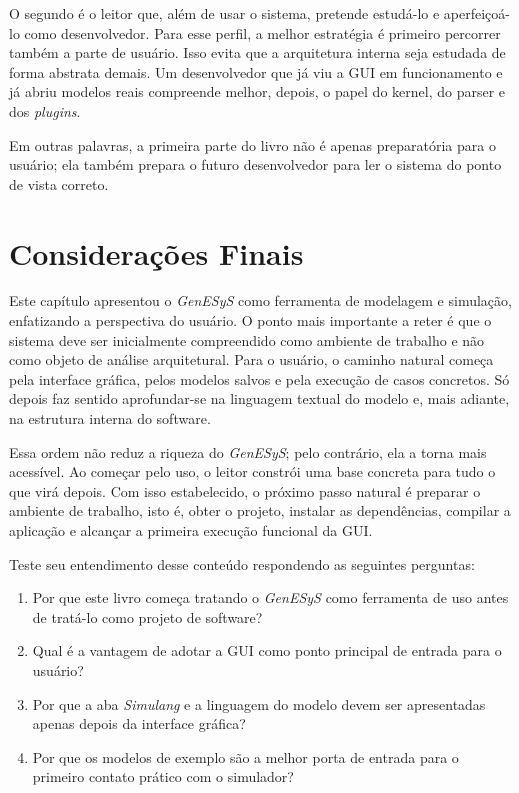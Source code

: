 O segundo é o leitor que, além de usar o sistema, pretende estudá-lo e aperfeiçoá-lo como desenvolvedor. Para esse perfil, a melhor estratégia é primeiro percorrer também a parte de usuário. Isso evita que a arquitetura interna seja estudada de forma abstrata demais. Um desenvolvedor que já viu a GUI em funcionamento e já abriu modelos reais compreende melhor, depois, o papel do kernel, do parser e dos \textit{plugins}.

Em outras palavras, a primeira parte do livro não é apenas preparatória para o usuário; ela também prepara o futuro desenvolvedor para ler o sistema do ponto de vista correto.

\section{Considerações Finais}
\label{sec:cap1_consideracoes_finais}

Este capítulo apresentou o \textit{GenESyS} como ferramenta de modelagem e simulação, enfatizando a perspectiva do usuário. O ponto mais importante a reter é que o sistema deve ser inicialmente compreendido como ambiente de trabalho e não como objeto de análise arquitetural. Para o usuário, o caminho natural começa pela interface gráfica, pelos modelos salvos e pela execução de casos concretos. Só depois faz sentido aprofundar-se na linguagem textual do modelo e, mais adiante, na estrutura interna do software.

Essa ordem não reduz a riqueza do \textit{GenESyS}; pelo contrário, ela a torna mais acessível. Ao começar pelo uso, o leitor constrói uma base concreta para tudo o que virá depois. Com isso estabelecido, o próximo passo natural é preparar o ambiente de trabalho, isto é, obter o projeto, instalar as dependências, compilar a aplicação e alcançar a primeira execução funcional da GUI.

Teste seu entendimento desse conteúdo respondendo as seguintes perguntas:

\begin{enumerate}
    \item Por que este livro começa tratando o \textit{GenESyS} como ferramenta de uso antes de tratá-lo como projeto de software?

    \item Qual é a vantagem de adotar a GUI como ponto principal de entrada para o usuário?

    \item Por que a aba \textit{Simulang} e a linguagem do modelo devem ser apresentadas apenas depois da interface gráfica?

    \item Por que os modelos de exemplo são a melhor porta de entrada para o primeiro contato prático com o simulador?
\end{enumerate}